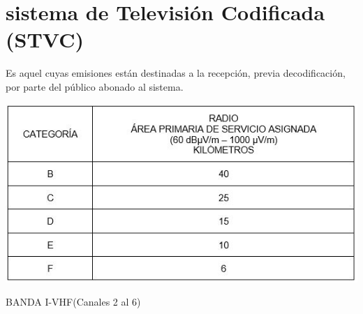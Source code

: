 \newpage
\section{sistema de Televisión Codificada (STVC)}
Es aquel cuyas emisiones están destinadas a la recepción, previa decodificación, por parte del público abonado al sistema.

\begin{table}[ht]
    \begin{center}
        \includegraphics{contenido/img/ej7tab4.JPG}
        \caption{BANDA I-VHF(Canales 2 al 6)}
    \end{center}
\end{table}